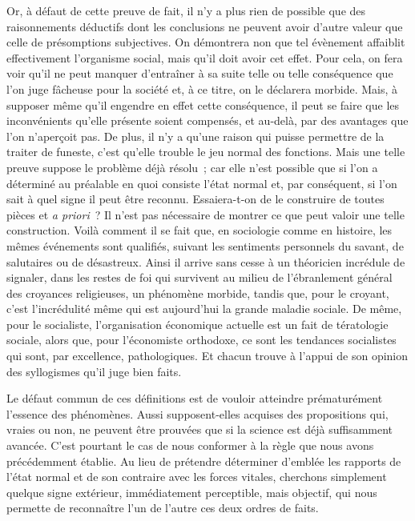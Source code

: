 \documentclass[french,twoside]{book} %
\begin{document}
Or, à défaut de cette preuve de fait, il n’y a plus rien de possible que des raisonnements déductifs dont les conclusions ne peuvent avoir d’autre valeur que celle de présomptions subjectives. On démontrera non que tel évènement affaiblit effectivement l’organisme social, mais qu’il doit avoir cet effet. Pour cela, on fera voir qu’il ne peut manquer d’entraîner à sa suite telle ou telle conséquence que l’on juge fâcheuse pour la société et, à ce titre, on le déclarera morbide. Mais, à supposer même qu’il engendre en effet cette conséquence, il peut se faire que les inconvénients qu’elle présente soient compensés, et au-delà, par des avantages que l’on n’aperçoit pas. De plus, il n’y a qu’une raison qui puisse permettre de la traiter de funeste, c’est qu’elle trouble le jeu normal des fonctions. Mais une telle preuve suppose le problème déjà résolu ; car elle n’est possible que si l’on a déterminé au préalable en quoi consiste l’état normal et, par conséquent, si l’on sait à quel signe il peut être reconnu. Essaiera-t-on de le construire de toutes pièces et {\itshape a priori} ? Il n’est pas nécessaire de montrer ce que peut valoir une telle construction. Voilà comment il se fait que, en sociologie comme en histoire, les mêmes événements sont qualifiés, suivant les sentiments personnels du savant, de salutaires ou de désastreux. Ainsi il arrive sans cesse à un théoricien incrédule de signaler, dans les restes de foi qui survivent au milieu de l’ébranlement général des croyances religieuses, un phénomène morbide, tandis que, pour le croyant, c’est l’incrédulité même qui est aujourd’hui la grande maladie sociale. De même, pour le socialiste, l’organisation économique actuelle est un fait de tératologie sociale, alors que, pour l’économiste orthodoxe, ce sont les tendances socialistes qui sont, par excellence, pathologiques. Et chacun trouve à l’appui de son opinion des syllogismes qu’il juge bien faits.\par
Le défaut commun de ces définitions est de vouloir atteindre prématurément l’essence des phénomènes. Aussi supposent-elles acquises des propositions qui, vraies ou non, ne peuvent être prouvées que si la science est déjà suffisamment avancée. C’est pourtant le cas de nous conformer à la règle que nous avons précédemment établie. Au lieu de prétendre déterminer d’emblée les rapports de l’état normal et de son contraire avec les forces vitales, cherchons simplement quelque signe extérieur, immédiatement perceptible, mais objectif, qui nous permette de reconnaître l’un de l’autre ces deux ordres de faits.\par
\end{document}
